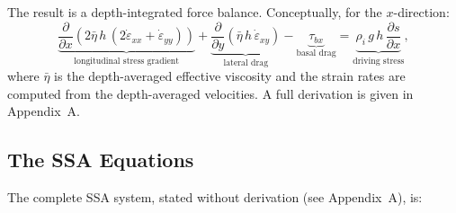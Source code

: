 \documentclass[11pt]{article}
\begin{document}
\noindent The result is a depth-integrated force balance.  Conceptually, for the $x$-direction:
\begin{equation}
  \underbrace{\frac{\partial}{\partial x}\!\left(2\bar{\eta}\,h\,(2\dot{\varepsilon}_{xx} + \dot{\varepsilon}_{yy})\right)}_{\text{longitudinal stress gradient}}
  + \underbrace{\frac{\partial}{\partial y}\!\left(\bar{\eta}\,h\,\dot{\varepsilon}_{xy}\right)}_{\text{lateral drag}}
  - \underbrace{\tau_{bx}}_{\text{basal drag}}
  = \underbrace{\rho_i\,g\,h\,\frac{\partial s}{\partial x}}_{\text{driving stress}},
  \label{eq:ssa_conceptual}
\end{equation}
where $\bar{\eta}$ is the depth-averaged effective viscosity and the strain rates are computed from the depth-averaged velocities.  A full derivation is given in Appendix~A.

\subsection{The SSA Equations}

The complete SSA system, stated without derivation (see Appendix~A), is:
\end{document}
